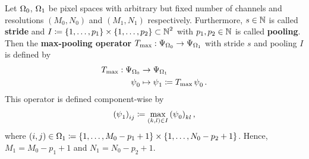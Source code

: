 \begin{definition}\label{def:max_pooling_op}
Let $\Omega_0$, $\Omega_1$ be pixel spaces with arbitrary but fixed number of channels and resolutions $(M_0,N_0)$ and $(M_1,N_1)$ respectively. Furthermore, $s\in\operatorname{\mathbb{N}}$ is called \textbf{stride} and $I\coloneqq \{1,\ldots,p_1\}\times \{1,\ldots,p_2\} \subset\operatorname{\mathbb{N}}^2$ with $p_1,p_2\in\operatorname{\mathbb{N}}$ is called \textbf{pooling}.\\
Then the \textbf{max-pooling operator} $T_{\text{max}}: \Psi_{\Omega_0} \to \Psi_{\Omega_1}$ with stride $s$ and pooling $I$ is defined by
\begin{align*}
T_{\text{max}}: \Psi_{\Omega_0} &\to \Psi_{\Omega_1} \\
\operatorname{\psi}_0 &\mapsto \operatorname{\psi}_1 \coloneqq T_{\text{max}}\operatorname{\psi}_0 .
\end{align*}
This operator is defined component-wise by
\begin{align}
\left(\operatorname{\psi}_1\right)_{ij} \coloneqq  \max_{(k,l)\in I} \left(\operatorname{\psi}_0\right)_{kl},
\end{align}
where $(i,j) \in \Omega_1 \coloneqq \{1,\ldots, M_0-p_1+1\} \times \{1,\ldots, N_0-p_2+1\}$. Hence, $M_1 = M_0-p_1+1$ and $N_1 = N_0-p_2+1$.
\end{definition}
